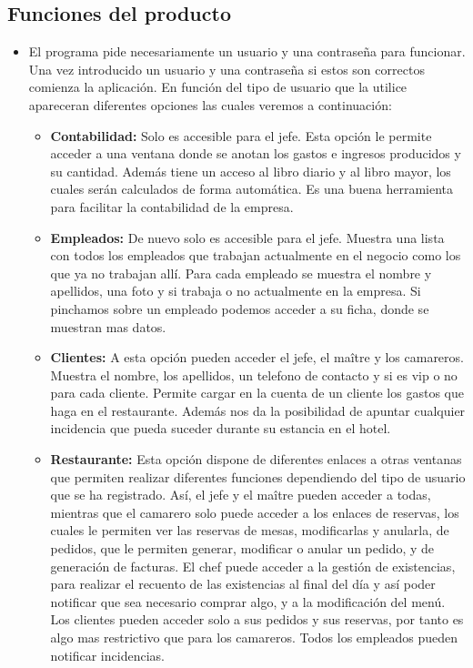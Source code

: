 \documentclass[spanish,a4paper,12pt]{report}		%
\begin{document}
\subsection{Funciones del producto}
	\begin{itemize}
		\item El programa pide necesariamente un usuario y una contraseña para funcionar. Una vez introducido un usuario y una contraseña si estos son correctos comienza la aplicación. En función del tipo de usuario que la utilice apareceran diferentes opciones las cuales veremos a continuación:
		\begin{itemize}
			\item \textbf{Contabilidad:} Solo es accesible para el jefe. Esta opción le permite acceder a una ventana donde se anotan los gastos e ingresos producidos y su cantidad. Además tiene un acceso al libro diario y al libro mayor, los cuales serán calculados de forma automática. Es una buena herramienta para facilitar la contabilidad de la empresa.
			\item \textbf{Empleados:} De nuevo solo es accesible para el jefe. Muestra una lista con todos los empleados que trabajan actualmente en el negocio como los que ya no trabajan allí. Para cada empleado se muestra el nombre y apellidos, una foto y si trabaja o no actualmente en la empresa. Si pinchamos sobre un empleado podemos acceder a su ficha, donde se muestran mas datos.
			\item \textbf{Clientes:} A esta opción pueden acceder el jefe, el maître y los camareros. Muestra el nombre, los apellidos, un telefono de contacto y si es vip o no para cada cliente. Permite cargar en la cuenta de un cliente los gastos que haga en el restaurante. Además nos da la posibilidad de apuntar cualquier incidencia que pueda suceder durante su estancia en el hotel.
			\item \textbf{Restaurante:} Esta opción dispone de diferentes enlaces a otras ventanas que permiten realizar diferentes funciones dependiendo del tipo de usuario que se ha registrado. Así, el jefe y el maître pueden acceder a todas, mientras que el camarero solo puede acceder a los enlaces de reservas, los cuales le permiten ver las reservas de mesas, modificarlas y anularla, de pedidos, que le permiten generar, modificar o anular un pedido, y de generación de facturas. El chef puede acceder a la gestión de existencias, para realizar el recuento de las existencias al final del día y así poder notificar que sea necesario comprar algo, y a la modificación del menú. Los clientes pueden acceder solo a sus pedidos y sus reservas, por tanto es algo mas restrictivo que para los camareros. Todos los empleados pueden notificar incidencias.

\end{itemize}
\end{itemize}
\end{document}
